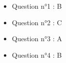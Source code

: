 \begin{itemize}[itemsep=1em]
	\item Question n°1 : B
	\item Question n°2 : C
	\item Question n°3 : A
	\item Question n°4 : B
\end{itemize}